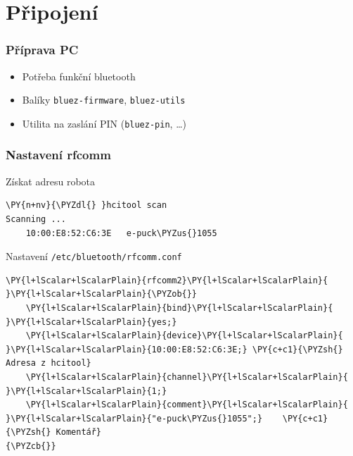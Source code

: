 \documentclass{beamer}
\begin{document}
\section{Připojení}

\begin{frame}
    \frametitle{Příprava PC}
    \begin{itemize}
        \item Potřeba funkční bluetooth
        \item Balíky {\tt bluez-firmware}, {\tt bluez-utils}
        \item Utilita na zaslání PIN ({\tt bluez-pin}, \ldots)
    \end{itemize}
\end{frame}

\begin{frame}[fragile]
    \frametitle{Nastavení rfcomm}
    \begin{block}{Získat adresu robota}
    \begin{Verbatim}[commandchars=\\\{\}]
\PY{n+nv}{\PYZdl{} }hcitool scan
Scanning ...
	10:00:E8:52:C6:3E	e-puck\PYZus{}1055
\end{Verbatim}
    \end{block}

    \begin{block}{Nastavení {\tt /etc/bluetooth/rfcomm.conf}}
\begin{Verbatim}[commandchars=\\\{\}]
\PY{l+lScalar+lScalarPlain}{rfcomm2}\PY{l+lScalar+lScalarPlain}{ }\PY{l+lScalar+lScalarPlain}{\PYZob{}}
    \PY{l+lScalar+lScalarPlain}{bind}\PY{l+lScalar+lScalarPlain}{ }\PY{l+lScalar+lScalarPlain}{yes;}
    \PY{l+lScalar+lScalarPlain}{device}\PY{l+lScalar+lScalarPlain}{ }\PY{l+lScalar+lScalarPlain}{10:00:E8:52:C6:3E;} \PY{c+c1}{\PYZsh{} Adresa z hcitool}
    \PY{l+lScalar+lScalarPlain}{channel}\PY{l+lScalar+lScalarPlain}{ }\PY{l+lScalar+lScalarPlain}{1;}
    \PY{l+lScalar+lScalarPlain}{comment}\PY{l+lScalar+lScalarPlain}{ }\PY{l+lScalar+lScalarPlain}{"e-puck\PYZus{}1055";}    \PY{c+c1}{\PYZsh{} Komentář}
{\PYZcb{}}
\end{Verbatim}

    \end{block}
\end{frame}
\end{document}
